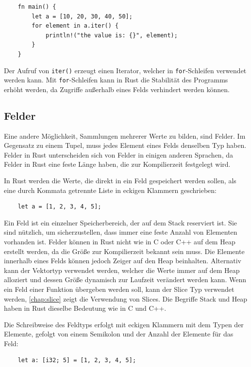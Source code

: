\begin{lstlisting}
    fn main() {
        let a = [10, 20, 30, 40, 50];
        for element in a.iter() {
            println!("the value is: {}", element);
        }
    }
\end{lstlisting}

Der Aufruf von \verb"iter()" erzeugt einen Iterator, welcher in \verb"for"-Schleifen verwendet werden kann. Mit \verb"for"-Schleifen kann in Rust die Stabilität des Programms erhöht werden, da Zugriffe außerhalb eines Felds verhindert werden können.

\subsection{Felder}\label{chap:array}

Eine andere Möglichkeit, Sammlungen mehrerer Werte zu bilden, sind Felder. Im Gegensatz zu einem Tupel, muss jedes Element eines Felds denselben Typ haben. Felder in Rust unterscheiden sich von Felder in einigen anderen Sprachen, da Felder in Rust eine feste Länge haben, die zur Kompilierzeit festgelegt wird.

In Rust werden die Werte, die direkt in ein Feld gespeichert werden sollen, als eine durch Kommata getrennte Liste in eckigen Klammern geschrieben:

\begin{lstlisting}
    let a = [1, 2, 3, 4, 5];
\end{lstlisting}

Ein Feld ist ein einzelner Speicherbereich, der auf dem Stack reserviert ist. Sie sind nützlich, um si\-cher\-zu\-stel\-len, dass immer eine feste Anzahl von Elementen vorhanden ist. Felder können in Rust nicht wie in C oder C++ auf dem Heap erstellt werden, da die Größe zur Kompilierzeit bekannt sein muss. Die Elemente innerhalb eines Felds können jedoch Zeiger auf den Heap beinhalten. Alternativ kann der Vektortyp verwendet werden, welcher die Werte immer auf dem Heap alloziert und dessen Größe dynamisch zur Laufzeit verändert werden kann. Wenn ein Feld einer Funktion übergeben werden soll, kann der Slice Typ verwendet werden, \autoref{chap:slice} zeigt die Verwendung von Slices. Die Begriffe Stack und Heap haben in Rust dieselbe Bedeutung wie in C und C++.

Die Schreibweise des Feldtyps erfolgt mit eckigen Klammern mit dem Typen der Elemente, gefolgt von einem Semikolon und der Anzahl der Elemente für das Feld:

\begin{lstlisting}
    let a: [i32; 5] = [1, 2, 3, 4, 5];
\end{lstlisting}

